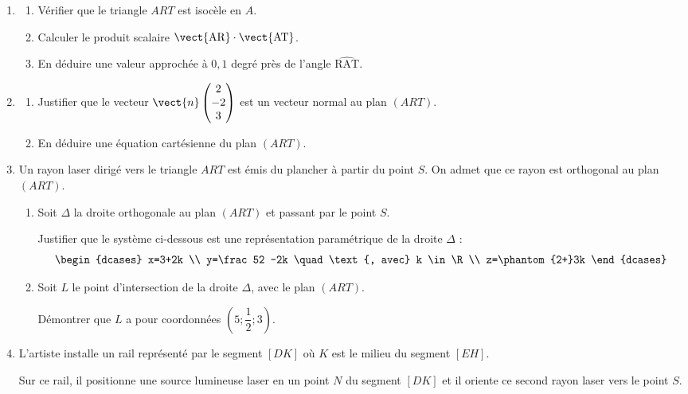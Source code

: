 \begin{enumerate}
	\item 
	\begin{enumerate}
		\item Vérifier que le triangle $ART$ est isocèle en $A$.
		\item Calculer le produit scalaire $\vect{\text{AR}} \cdot \vect{\text{AT}}$.
		\item En déduire une valeur approchée à $0,1$ degré près de l'angle $\widehat{\text{RAT}}$.
	\end{enumerate}
	\item 
	\begin{enumerate}
		\item Justifier que le vecteur $\vect{n}\begin{pmatrix}2\\-2\\3\end{pmatrix}$ est un vecteur normal au plan $(ART)$.
		\item En déduire une équation cartésienne du plan $(ART)$.
	\end{enumerate}
	\item Un rayon laser dirigé vers le triangle $ART$ est émis du plancher à partir du point $S$. On admet que ce rayon est orthogonal au plan $(ART)$.
	\begin{enumerate}
		\item Soit $\Delta$ la droite orthogonale au plan $(ART)$ et passant par le point $S$.
		
		Justifier que le système ci-dessous est une représentation paramétrique de la droite $\Delta$ : \[ \begin{dcases} x=3+2k \\ y=\frac52 -2k \quad \text{, avec} k \in \R \\ z=\phantom{2+}3k \end{dcases} \]
		\item Soit $L$ le point d'intersection de la droite $\Delta$, avec le plan $(ART)$.
		
		Démontrer que $L$ a pour coordonnées $\left(5;\dfrac12;3\right)$.
	\end{enumerate}
	\item L'artiste installe un rail représenté  par le segment $[DK]$ où $K$ est le milieu du segment $[EH]$.
	
	Sur ce rail, il positionne une source lumineuse laser en un point $N$ du segment $[DK]$ et il oriente ce second rayon laser vers le point $S$.
	

\end{enumerate}

